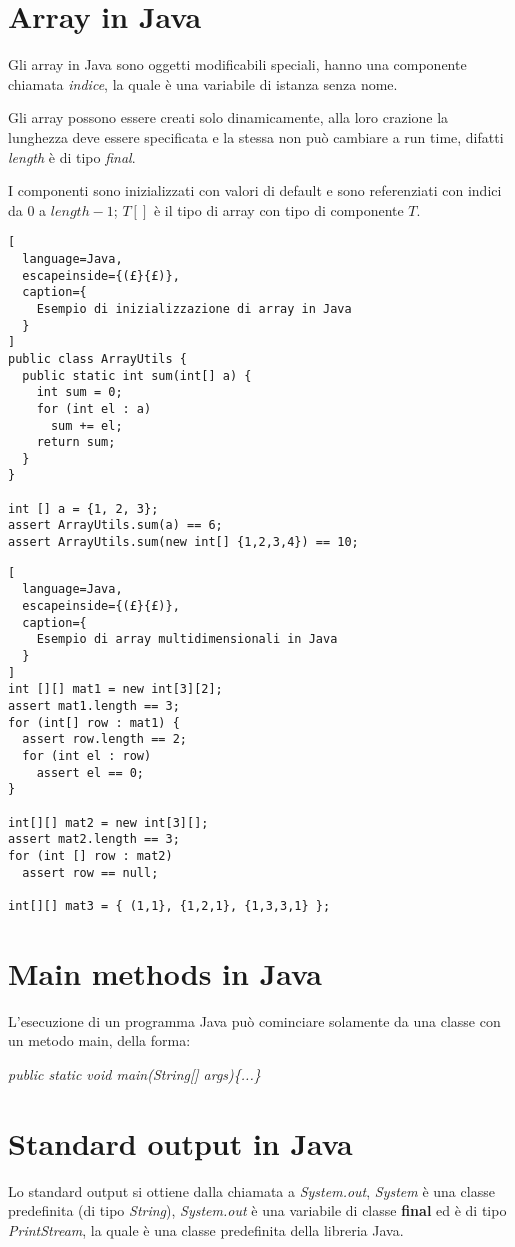 \section{Array in Java}
Gli array in Java sono oggetti modificabili speciali, hanno una componente
chiamata \emph{indice}, la quale è una variabile di istanza senza nome.

Gli array possono essere creati solo dinamicamente, alla loro crazione la
lunghezza deve essere specificata e la stessa non può cambiare a run time,
difatti \emph{length} è di tipo \emph{final}.

I componenti sono inizializzati con valori di default e sono referenziati con
indici da $0$ a $length-1$; $T[]$ è il tipo di array con tipo di componente
$T$.

\begin{lstlisting}[
  language=Java,
  escapeinside={(£}{£)},
  caption={
    Esempio di inizializzazione di array in Java
  }
]
public class ArrayUtils {
  public static int sum(int[] a) {
    int sum = 0;
    for (int el : a)
      sum += el;
    return sum;
  }
}

int [] a = {1, 2, 3};
assert ArrayUtils.sum(a) == 6;
assert ArrayUtils.sum(new int[] {1,2,3,4}) == 10;
\end{lstlisting}

\begin{lstlisting}[
  language=Java,
  escapeinside={(£}{£)},
  caption={
    Esempio di array multidimensionali in Java
  }
]
int [][] mat1 = new int[3][2];
assert mat1.length == 3;
for (int[] row : mat1) {
  assert row.length == 2;
  for (int el : row)
    assert el == 0;
}

int[][] mat2 = new int[3][];
assert mat2.length == 3;
for (int [] row : mat2)
  assert row == null;

int[][] mat3 = { (1,1}, {1,2,1}, {1,3,3,1} };
\end{lstlisting}

\section{Main methods in Java}
L'esecuzione di un programma Java può cominciare solamente da una classe con
un metodo main, della forma:

\emph{public static void main(String[] args)\{...\}}

\section{Standard output in Java}
Lo standard output si ottiene dalla chiamata a \emph{System.out}, \emph{System}
è una classe predefinita (di tipo \emph{String}), \emph{System.out} è una
variabile di classe \textbf{final} ed è di tipo \emph{PrintStream}, la quale
è una classe predefinita della libreria Java.

